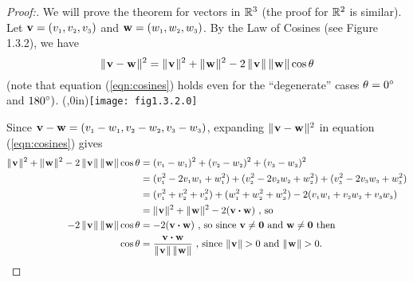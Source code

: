 \begin{proofbar}\vspace{-3mm}\begin{proof}[Proof:]
 We will prove the theorem for vectors in $\mathbb{R}^{3}$ (the proof for $\mathbb{R}^{2}$ is similar). Let
 $\textbf{v} = (v_{\scriptscriptstyle 1},v_{\scriptscriptstyle 2},v_{\scriptscriptstyle 3})$ and $\textbf{w} = (w_{\scriptscriptstyle 1},w_{\scriptscriptstyle 2},w_{\scriptscriptstyle 3})$. By the Law of Cosines (see Figure 1.3.2), we
 have
 \begin{equation}\label{eqn:cosines}
  \lVert\mspace{1mu}\textbf{v} - \textbf{w}\mspace{1mu}\rVert^2 = \lVert\mspace{1mu}\textbf{v}\mspace{1mu}\rVert^2 + \lVert\mspace{1mu}\textbf{w}\mspace{1mu}\rVert^2 -
  2\,\lVert\mspace{1mu}\textbf{v}\mspace{1mu}\rVert\,\lVert\mspace{1mu}\textbf{w}\mspace{1mu}\rVert \cos \theta
 \end{equation}
 (note that equation (\ref{eqn:cosines}) holds even for the ``degenerate'' cases $\theta = 0^\circ$ and $180^\circ)$.
 \piccaption[]{}\parpic(\textwidth,0in){\texttt{[image: fig1.3.2.0]}\piccaptioninside}
 \par\mbox{}\newline\vspace{1mm}

 Since $\textbf{v} - \textbf{w} = (v_{\scriptscriptstyle 1} - w_{\scriptscriptstyle 1}, v_{\scriptscriptstyle 2} - w_{\scriptscriptstyle 2},v_{\scriptscriptstyle 3} - w_{\scriptscriptstyle 3})$, expanding $\lVert\mspace{1mu}\textbf{v} - \textbf{w}\mspace{1mu}\rVert^2$
 in equation (\ref{eqn:cosines}) gives
 \begin{align*}
  \norm{\textbf{v}}^2 + \norm{\textbf{w}}^2 - 2\,\norm{\textbf{v}}\,\norm{\textbf{w}} \cos \theta &=
  (\ssub{v}{1} - \ssub{w}{1})^2 + (\ssub{v}{2} - \ssub{w}{2})^2 + (\ssub{v}{3} - \ssub{w}{3})^2\\
  &=
  (\ssub{v}{1}^2 - 2\ssub{v}{1}\ssub{w}{1} + \ssub{w}{1}^2) + (\ssub{v}{2}^2 - 2\ssub{v}{2}\ssub{w}{2} + \ssub{w}{2}^2)
  + (\ssub{v}{3}^2 - 2\ssub{v}{3}\ssub{w}{3} + \ssub{w}{3}^2)\\
  &= (\ssub{v}{1}^2 + \ssub{v}{2}^2 + \ssub{v}{3}^2) + (\ssub{w}{1}^2 + \ssub{w}{2}^2 + \ssub{w}{3}^2) -
  2(\ssub{v}{1}\ssub{w}{1} + \ssub{v}{2}\ssub{w}{2} + \ssub{v}{3}\ssub{w}{3})\\
  &=
  \norm{\textbf{v}}^2 + \norm{\textbf{w}}^2 - 2(\Dotprod{\textbf{v}}{\textbf{w}}) \text{~,~so}\\
  -2\,\norm{\textbf{v}}\,\norm{\textbf{w}} \cos \theta &= -2(\Dotprod{\textbf{v}}{\textbf{w}}) \text{~,~so since
  $\textbf{v} \ne \textbf{0}$ and $\textbf{w} \ne \textbf{0}$ then}\\
  \cos \theta &= \frac{\Dotprod{\textbf{v}}{\textbf{w}}}{\norm{\textbf{v}} \, \norm{\textbf{w}}} \text{~,~since
  $\norm{\textbf{v}} > 0$ and $\norm{\textbf{w}} > 0$. \hfill\qedhere}
 \end{align*}
\end{proof}\vspace{-3mm}\end{proofbar}

